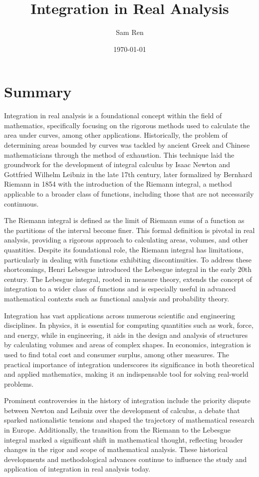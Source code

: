 \documentclass[12pt]{article}
\title{Integration in Real Analysis}
\author{Sam Ren}
\date{\today}
\begin{document}
\maketitle

\tableofcontents

\section{Summary}
Integration in real analysis is a foundational concept within the field of mathematics, specifically focusing on the rigorous methods used to calculate the area under curves, among other applications. Historically, the problem of determining areas bounded by curves was tackled by ancient Greek and Chinese mathematicians through the method of exhaustion. This technique laid the groundwork for the development of integral calculus by Isaac Newton and Gottfried Wilhelm Leibniz in the late 17th century, later formalized by Bernhard Riemann in 1854 with the introduction of the Riemann integral, a method applicable to a broader class of functions, including those that are not necessarily continuous.

The Riemann integral is defined as the limit of Riemann sums of a function as the partitions of the interval become finer. This formal definition is pivotal in real analysis, providing a rigorous approach to calculating areas, volumes, and other quantities. Despite its foundational role, the Riemann integral has limitations, particularly in dealing with functions exhibiting discontinuities. To address these shortcomings, Henri Lebesgue introduced the Lebesgue integral in the early 20th century. The Lebesgue integral, rooted in measure theory, extends the concept of integration to a wider class of functions and is especially useful in advanced mathematical contexts such as functional analysis and probability theory.

Integration has vast applications across numerous scientific and engineering disciplines. In physics, it is essential for computing quantities such as work, force, and energy, while in engineering, it aids in the design and analysis of structures by calculating volumes and areas of complex shapes. In economics, integration is used to find total cost and consumer surplus, among other measures. The practical importance of integration underscores its significance in both theoretical and applied mathematics, making it an indispensable tool for solving real-world problems.

Prominent controversies in the history of integration include the priority dispute between Newton and Leibniz over the development of calculus, a debate that sparked nationalistic tensions and shaped the trajectory of mathematical research in Europe. Additionally, the transition from the Riemann to the Lebesgue integral marked a significant shift in mathematical thought, reflecting broader changes in the rigor and scope of mathematical analysis. These historical developments and methodological advances continue to influence the study and application of integration in real analysis today.
\end{document}
